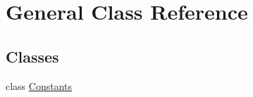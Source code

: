 \hypertarget{class_general}{}\section{General Class Reference}
\label{class_general}
\subsection*{Classes}
\begin{DoxyCompactItemize}
\item 
class \hyperlink{class_general_1_1_constants}{Constants}
\end{DoxyCompactItemize}
